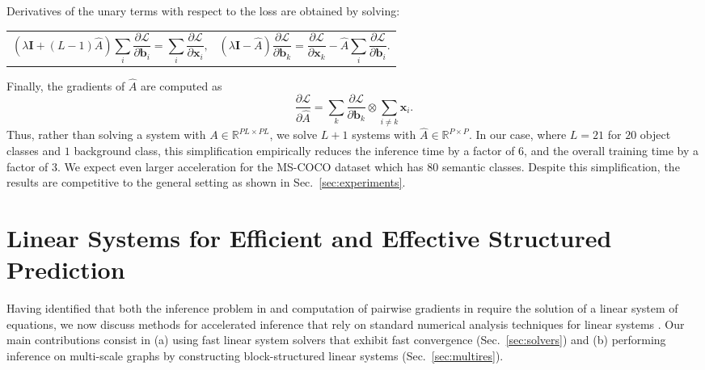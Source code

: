 \documentclass[runningheads]{llncs}
\newcommand{\refsec}[1]{Sec.~{\ref{#1}}}
\begin{document}
Derivatives of the unary terms with respect to the loss are obtained by solving:

\noindent\begin{tabularx}{\textwidth}{@{}XX@{}}
\begin{equation}
\left(\lambda \textbf{I} + \left(L - 1\right)\hat{A}\right) \sum_{i} \frac{\partial \mathcal{L}}{\partial \textbf{b}_i} = \sum_i \frac{\partial \mathcal{L}}{\partial \textbf{x}_i} \text{,}
\label{eq:sumdiffeqn}
\end{equation} &
\begin{equation}
(\lambda \textbf{I}-\hat{A})\frac{\partial \mathcal{L}}{\partial \textbf{b}_k} = \frac{\partial \mathcal{L}}{\partial \textbf{x}_k} - \hat{A} \sum_{i} \frac{\partial \mathcal{L}}{\partial \textbf{b}_i} \text{.}
\label{eq:diffbk}
\end{equation} 
\end{tabularx}

Finally, the gradients of $\hat{A}$ are computed as 
\begin{equation}
\frac{\partial \mathcal{L}}{\partial \hat{A}} = \sum_{k} \frac{\partial \mathcal{L}}{\partial \textbf{b}_k} \otimes \sum_{i\neq k} \textbf{x}_i \text{.}
\end{equation}
Thus, rather than solving a system with $A \in \mathbb{R}^{PL \times PL}$, we solve $L+1$ systems with $\hat{A} \in \mathbb{R}^{P\times P}$. In our case, where $L = 21$ for $20$ object classes and $1$ background class, 
this simplification empirically reduces the inference time by a factor of $6$, and the overall training time by a factor of $3$.
We expect even larger acceleration for the MS-COCO dataset which has $80$ semantic classes. 
Despite this simplification, the results are competitive to the general setting as shown in Sec.~\ref{sec:experiments}.
 \section{Linear Systems for Efficient and Effective Structured Prediction}
\label{sec:optimization}
Having identified that both the inference problem in  and computation of pairwise gradients in  require the
solution of a linear system of equations, we 
now discuss  methods for accelerated inference that rely on standard numerical analysis techniques for linear systems  \cite{PressTVF92,Golub96}. 
Our  main contributions consist in (a) using fast linear system solvers that exhibit 
 fast convergence (\refsec{sec:solvers})  and (b) performing inference on multi-scale graphs by constructing block-structured linear systems (\refsec{sec:multires}).
 
\end{document}
